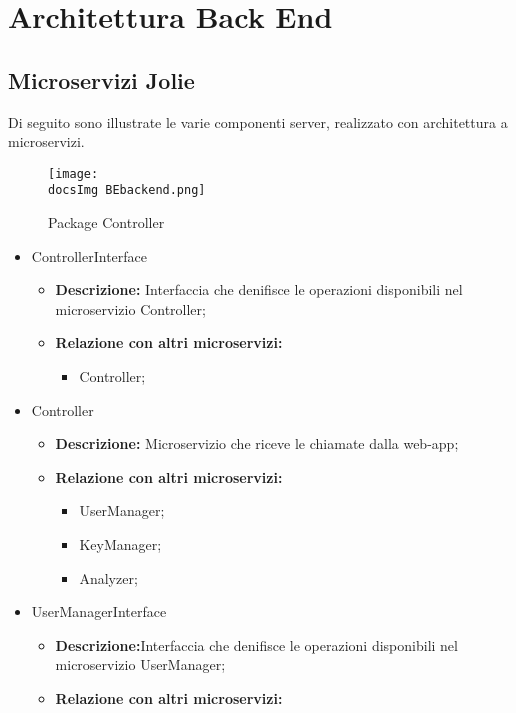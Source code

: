 \section{Architettura Back End}{

  \subsection{Microservizi Jolie}
Di seguito sono illustrate le varie componenti server, realizzato con architettura a microservizi.

	\begin{figure}[ht]
		\centering
		\texttt{[image: \\docsImg BEbackend.png]}
		\caption{Package Controller}
		\label{Package Controller}
	\end{figure}

\begin{itemize}
\item ControllerInterface
  \begin{itemize}
  \item \textbf{Descrizione:} Interfaccia che denifisce le operazioni disponibili nel microservizio Controller;
    \item \textbf{Relazione con altri microservizi:}
      \begin{itemize}
      \item Controller;
      \end{itemize}
  \end{itemize}
\item Controller
  \begin{itemize}
  \item \textbf{Descrizione:} Microservizio che riceve le chiamate dalla web-app;
    \item \textbf{Relazione con altri microservizi:}
      \begin{itemize}
      \item UserManager;
        \item KeyManager;
        \item Analyzer;
      \end{itemize}
  \end{itemize}
\item UserManagerInterface
  \begin{itemize}
  \item \textbf{Descrizione:}Interfaccia che denifisce le operazioni disponibili nel microservizio UserManager;
    \item \textbf{Relazione con altri microservizi:}
      \begin{itemize}

\end{itemize}
\end{itemize}
\end{itemize}}

